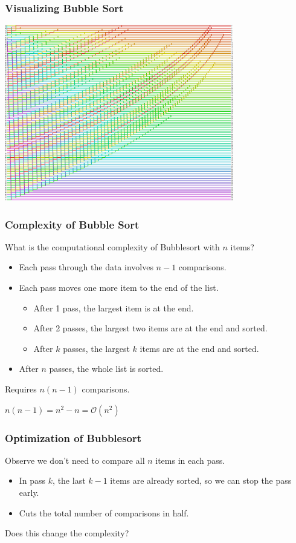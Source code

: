 \documentclass{beamer} %
\begin{document}
\begin{frame}
  \frametitle{Visualizing Bubble Sort}
  \centering
  \includegraphics[width=100mm]{assets/bubblesort2.pdf}
\end{frame}

\begin{frame}
  \frametitle{Complexity of Bubble Sort}
  What is the computational complexity of Bubblesort with $n$ items?
  \begin{itemize}
  \item Each pass through the data involves $n-1$ comparisons.
  \item Each pass moves one more item to the end of the list.
    \begin{itemize}
    \item After 1 pass, the largest item is at the end.
    \item After 2 passes, the largest two items are at the end and sorted.
    \item After $k$ passes, the largest $k$ items are at the end and sorted.
    \end{itemize}
  \item After $n$ passes, the whole list is sorted.
  \end{itemize}
  \vspace{3mm}
  Requires $n(n-1)$ comparisons.

  \vspace{3mm}
  $n(n-1) = n^2 - n = \mathcal{O}(n^2)$
\end{frame}

\begin{frame}
  \frametitle{Optimization of Bubblesort}
  Observe we don't need to compare all $n$ items in each pass.
  \begin{itemize}
  \item In pass $k$, the last $k-1$ items are already sorted, so we can stop the pass early.
  \item Cuts the total number of comparisons in half.
  \end{itemize}
  Does this change the complexity?
\end{frame}
\end{document}
